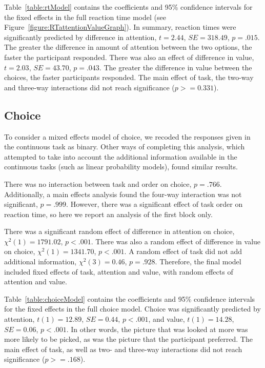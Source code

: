 \documentclass[12pt]{article}
\begin{document}
Table~\ref{table:rtModel} contains the coefficients and 95\% confidence intervals for the fixed effects in the full reaction time model (see Figure~\ref{figure:RTattentionValueGraph}). In summary, reaction times were significantly predicted by difference in attention, $t=2.44$, $SE=318.49$, $p=.015$. The greater the difference in amount of attention between the two options, the faster the participant responded. There was also an effect of difference in value, $t=2.03$, $SE=43.70$, $p=.043$. The greater the difference in value between the choices, the faster participants responded. The main effect of task, the two-way and three-way interactions did not reach significance ($p>=0.331$). 


\subsection{Choice}
To consider a mixed effects model of choice, we recoded the responses given in the continuous task as binary. Other ways of completing this analysis, which attempted to take into account the additional information available in the continuous tasks (such as linear probability models), found similar results. 

There was no interaction between task and order on choice, $p=.766$. Additionally, a main effects analysis found the four-way interaction was not significant, $p=.999$. However, there was a significant effect of task order on reaction time, so here we report an analysis of the first block only. 

 

There was a significant random effect of difference in attention on choice, $\chi^2(1)=1791.02$, $p<.001$. There was also a random effect of difference in value on choice, $\chi^2(1)=1341.70$, $p<.001$. A random effect of task did not add additional information, $\chi^2(3)=0.46$, $p=.928$. Therefore, the final model included fixed effects of task, attention and value, with random effects of attention and value.

Table~\ref{table:choiceModel} contains the coefficients and 95\% confidence intervals for the fixed effects in the full choice model. Choice was significantly predicted by attention, $t(1)=12.89$, $SE=0.44$, $p<.001$, and value, $t(1)=14.28$, $SE=0.06$, $p<.001$. In other words, the picture that was looked at more was more likely to be picked, as was the picture that the participant preferred. The main effect of task, as well as two- and three-way interactions did not reach significance ($p>=.168$).
\end{document}
